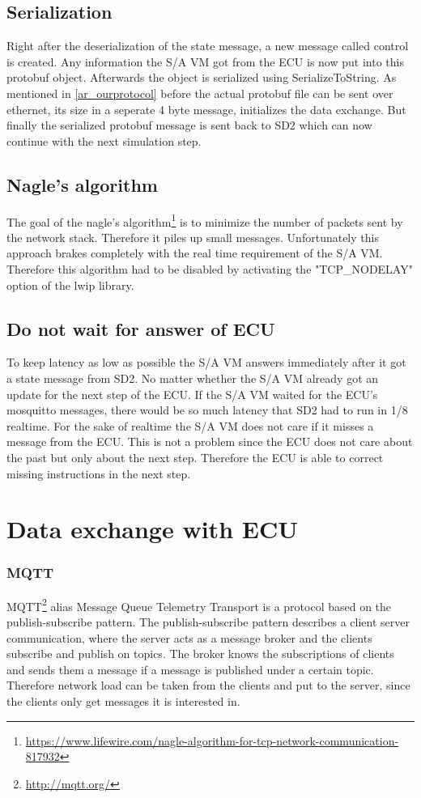 \documentclass[paper=a4, fontsize=11pt]{scrreprt}
\begin{document}
  \subsection{Serialization}
Right after the deserialization of the state message, a new message called control is created. Any information the S/A VM got from the ECU is now put into this protobuf object. Afterwards the object is serialized using SerializeToString. As mentioned in \ref{ar_ourprotocol} before the actual protobuf file can be sent over ethernet, its size in a seperate 4 byte message, initializes the data exchange. But finally the serialized protobuf message is sent back to SD2 which can now continue with the next simulation step.
  \subsection{Nagle's algorithm} \label{ar_naglealgo}
The goal of the nagle's algorithm\footnote{\url{https://www.lifewire.com/nagle-algorithm-for-tcp-network-communication-817932}} is to minimize the number of packets sent by the network stack. Therefore it piles up small messages. Unfortunately this approach brakes completely with the real time requirement of the S/A VM. Therefore this algorithm had to be disabled by activating the "TCP\_NODELAY" option of the lwip library.
  \subsection{Do not wait for answer of ECU}
To keep latency as low as possible the S/A VM answers immediately after it got a state message from SD2. No matter whether the S/A VM already got an update for the next step of the ECU. If the S/A VM waited for the ECU's mosquitto messages, there would be so much latency that SD2 had to run in 1/8 realtime. For the sake of realtime the S/A VM does not care if it misses a message from the ECU. This is not a problem since the ECU does not care about the past but only about the next step. Therefore the ECU is able to correct missing instructions in the next step.

\section{Data exchange with ECU}
  \subsubsection{MQTT}
MQTT\footnote{\url{http://mqtt.org/}} alias Message Queue Telemetry Transport is a protocol based on the publish-subscribe pattern.\newline
The publish-subscribe pattern describes a client server communication, where the server acts as a message broker and the clients subscribe and publish on topics. The broker knows the subscriptions of clients and sends them a message if a message is published under a certain topic. Therefore network load can be taken from the clients and put to the server, since the clients only get messages it is interested in.
\end{document}
